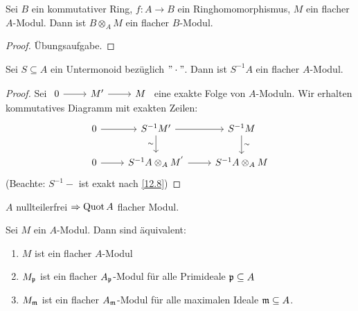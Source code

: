 \begin{bem} \label{13.21}
	Sei $B$ ein kommutativer Ring, $f: A \to B $ ein Ringhomomorphismus, $M$ ein flacher $A$-Modul. Dann ist $ B \otimes_A M $ ein flacher $B$-Modul. 
\end{bem}
\begin{proof}
	Übungsaufgabe.
\end{proof}
\begin{bem} \label{13.22}
	Sei $S \subseteq A $ ein Untermonoid bezüglich $ "\cdot " $. Dann ist $S^{-1}A $ ein flacher $A$-Modul. 
\end{bem}
\begin{proof}
	Sei $\begin{tikzcd} 0 \arrow{r} & M' \arrow{r} & M \end{tikzcd}$ eine exakte Folge von $A$-Moduln. Wir erhalten kommutatives Diagramm mit exakten Zeilen: 
	$$\begin{tikzcd}
	0 \arrow{r} &S^{-1}M' \arrow[swap]{d}{\sim}\arrow{r} &  S^{-1}M \arrow{d}{\sim} \\
0 \arrow{r} & 	S^{-1}A \otimes_A M^{'} \arrow{r} & S^{-1}A \otimes_A M
	\end{tikzcd}$$
	(Beachte: $S^{-1}-$ ist exakt nach \ref{12.8})
\end{proof}
\begin{anm}
	$A$ nullteilerfrei $\Rightarrow \operatorname{Quot} A $ flacher Modul.
\end{anm}
\begin{bem} \label{13.23}
	Sei $M$ ein $A$-Modul. Dann sind äquivalent: 
	\begin{enumerate} [label= \roman*)]
		\item $M$ ist ein flacher $A$-Modul 
		\item $M_{\mathfrak{p}} $ ist ein flacher $A_{\mathfrak{p}}$-Modul für alle Primideale $\mathfrak{p} \subseteq A$
		\item $M_{\mathfrak{m}}$ ist ein flacher $A_{\mathfrak{m}}$-Modul für alle maximalen Ideale $\mathfrak{m} \subseteq A$. 
		
	\end{enumerate}
\end{bem}
